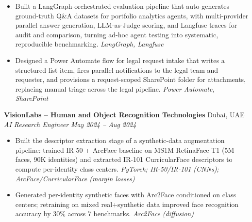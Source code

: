 \documentclass[10pt]{article}
\newcommand{\cventry}[2]{\textbf{#1} \hfill \textcolor{midtext}{#2} \\}
\newcommand{\cvrole}[2]{\textcolor{midtext}{\textit{#1}} \hfill \textcolor{midtext}{\textit{#2}} \\}
\newcommand{\stack}[1]{{\small\rmfamily\itshape\textcolor{stackgray}{#1}}}
\begin{document}
\begin{itemize}
    \item Built a LangGraph-orchestrated evaluation pipeline that auto-generates ground-truth Q\&A datasets for portfolio analytics agents, with multi-provider parallel answer generation, LLM-as-Judge scoring, and Langfuse traces for audit and comparison, turning ad-hoc agent testing into systematic, reproducible benchmarking. \stack{LangGraph, Langfuse}
    \item Designed a Power Automate flow for legal request intake that writes a structured list item, fires parallel notifications to the legal team and requester, and provisions a request-scoped SharePoint folder for attachments, replacing manual triage across the legal pipeline. \stack{Power Automate, SharePoint}
\end{itemize}

\vspace{4pt}

\cventry{VisionLabs -- Human and Object Recognition Technologies}{Dubai, UAE}
\cvrole{AI Research Engineer}{May 2024 -- Aug 2024}
\vspace{-7pt}
\begin{itemize}
    \item Built the descriptor extraction stage of a synthetic-data augmentation pipeline: trained IR-50 + ArcFace baseline on MS1M-RetinaFace-T1 (5M faces, 90K identities) and extracted IR-101 CurricularFace descriptors to compute per-identity class centers. \stack{PyTorch; IR-50/IR-101 (CNNs); ArcFace/CurricularFace (margin losses)}
    
    \item Generated per-identity synthetic faces with Arc2Face conditioned on class centers; retraining on mixed real+synthetic data improved face recognition accuracy by 30\% across 7 benchmarks. \stack{Arc2Face (diffusion)}
\end{itemize}

\vspace{4pt}
\end{document}
